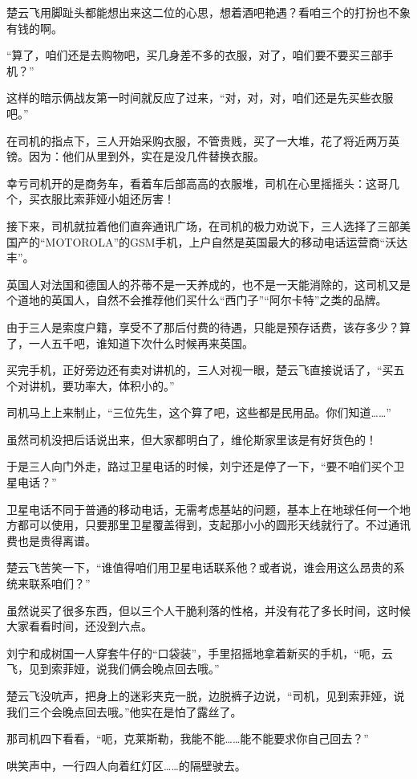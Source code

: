 楚云飞用脚趾头都能想出来这二位的心思，想着酒吧艳遇？看咱三个的打扮也不象有钱的啊。

“算了，咱们还是去购物吧，买几身差不多的衣服，对了，咱们要不要买三部手机？”

这样的暗示俩战友第一时间就反应了过来，“对，对，对，咱们还是先买些衣服吧。”

在司机的指点下，三人开始采购衣服，不管贵贱，买了一大堆，花了将近两万英镑。因为：他们从里到外，实在是没几件替换衣服。

幸亏司机开的是商务车，看着车后部高高的衣服堆，司机在心里摇摇头：这哥几个，买衣服比索菲娅小姐还厉害！

接下来，司机就拉着他们直奔通讯广场，在司机的极力劝说下，三人选择了三部美国产的“MOTOROLA”的GSM手机，上户自然是英国最大的移动电话运营商“沃达丰”。

英国人对法国和德国人的芥蒂不是一天养成的，也不是一天能消除的，这司机又是个道地的英国人，自然不会推荐他们买什么“西门子”“阿尔卡特”之类的品牌。

由于三人是索度户籍，享受不了那后付费的待遇，只能是预存话费，该存多少？算了，一人五千吧，谁知道下次什么时候再来英国。

买完手机，正好旁边还有卖对讲机的，三人对视一眼，楚云飞直接说话了，“买五个对讲机，要功率大，体积小的。”

司机马上上来制止，“三位先生，这个算了吧，这些都是民用品。你们知道……”

虽然司机没把后话说出来，但大家都明白了，维伦斯家里该是有好货色的！

于是三人向门外走，路过卫星电话的时候，刘宁还是停了一下，“要不咱们买个卫星电话？”

卫星电话不同于普通的移动电话，无需考虑基站的问题，基本上在地球任何一个地方都可以使用，只要那里卫星覆盖得到，支起那小小的圆形天线就行了。不过通讯费也是贵得离谱。

楚云飞苦笑一下，“谁值得咱们用卫星电话联系他？或者说，谁会用这么昂贵的系统来联系咱们？”

虽然说买了很多东西，但以三个人干脆利落的性格，并没有花了多长时间，这时候大家看看时间，还没到六点。

刘宁和成树国一人穿套牛仔的“口袋装”，手里招摇地拿着新买的手机，“呃，云飞，见到索菲娅，说我们俩会晚点回去哦。”

楚云飞没吭声，把身上的迷彩夹克一脱，边脱裤子边说，“司机，见到索菲娅，说我们三个会晚点回去哦。”他实在是怕了露丝了。

那司机四下看看，“呃，克莱斯勒，我能不能……能不能要求你自己回去？”

哄笑声中，一行四人向着红灯区……的隔壁驶去。


